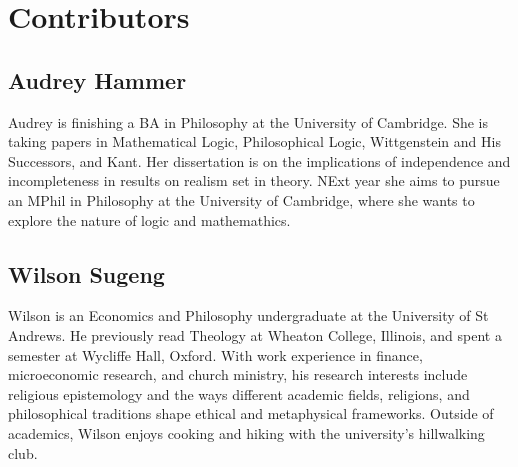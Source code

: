 \chapter{Contributors}

\section*{Audrey Hammer}

Audrey is finishing a BA in Philosophy at the University of Cambridge.
She is taking papers in Mathematical Logic, Philosophical Logic,
Wittgenstein and His Successors, and Kant. Her dissertation is on the
implications of independence and incompleteness in results on realism
set in theory. NExt year she aims to pursue an MPhil in Philosophy at
the University of Cambridge, where she wants to explore the nature of
logic and mathemathics.

\section*{Wilson Sugeng}

Wilson is an Economics and Philosophy undergraduate at the University of
St Andrews. He previously read Theology at Wheaton College, Illinois,
and spent a semester at Wycliffe Hall, Oxford. With work experience in
finance, microeconomic research, and church ministry, his research
interests include religious epistemology and the ways different academic
fields, religions, and philosophical traditions shape ethical and
metaphysical frameworks. Outside of academics, Wilson enjoys cooking and
hiking with the university's hillwalking club.

